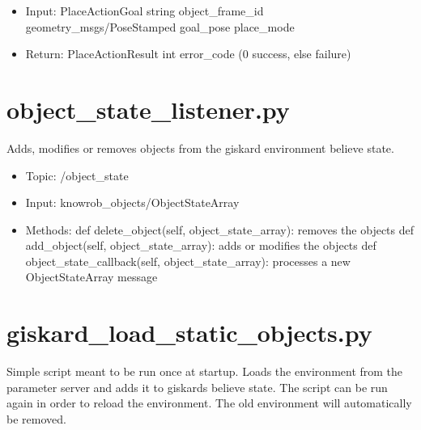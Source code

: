 \documentclass[main.tex]{subfiles}
\begin{document}
			\begin{itemize}
				\item Input: PlaceActionGoal 
				\subitem string object\_frame\_id 
				\subitem geometry\_msgs/PoseStamped goal\_pose
				\subitem place\_mode
				\item Return: PlaceActionResult
				\subitem int error\_code (0 success, else failure)
			\end{itemize}
			
			\section{object\_state\_listener.py} 
			Adds, modifies or removes objects from the giskard environment believe state.
			
			\begin{itemize}
				\item Topic: /object\_state
				\item Input: knowrob\_objects/ObjectStateArray
				\item Methods:
				\subitem def delete\_object(self, object\_state\_array): removes the objects
				\subitem def add\_object(self, object\_state\_array): adds or modifies the objects
				\subitem def object\_state\_callback(self, object\_state\_array): processes a new ObjectStateArray message
			\end{itemize}
			
			\section{giskard\_load\_static\_objects.py} 
			Simple script meant to be run once at startup. Loads the environment from the parameter server and adds it to giskards believe state. 
			The script can be run again in order to reload the environment. The old environment will automatically be removed.
			
			 


			
	\endgroup
\end{document}
